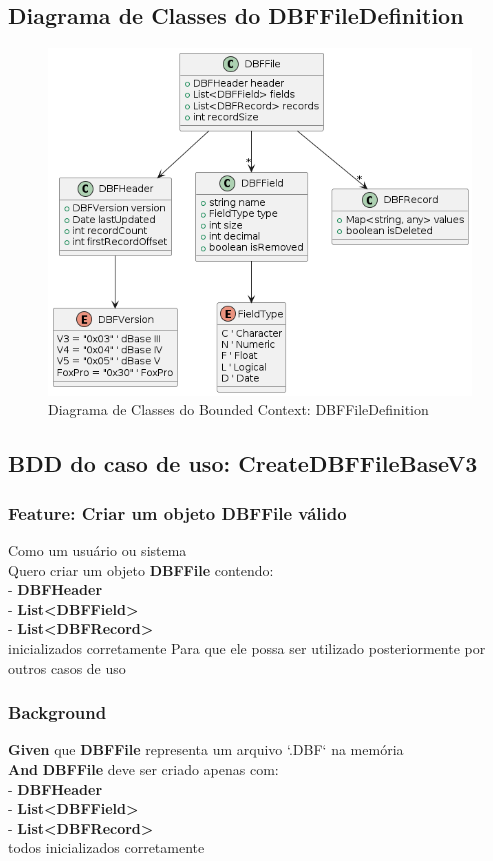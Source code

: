 \subsection{Diagrama de Classes do DBFFileDefinition}
\begin{figure}[H]
    \centering
    \includegraphics[width=1\textwidth]{image/uml_DBFESTRUCTURE.png}
    \caption{Diagrama de Classes do Bounded Context: DBFFileDefinition}
\end{figure}

\subsection{BDD do caso de uso: CreateDBFFileBaseV3}
\subsubsection{Feature: Criar um objeto DBFFile válido}
Como um usuário ou sistema \\
Quero criar um objeto \textbf{DBFFile} contendo: \\
- \textbf{DBFHeader}\\
- \textbf{List<DBFField>} \\
- \textbf{List<DBFRecord>}\\
inicializados corretamente Para que ele possa ser utilizado posteriormente por outros casos de uso \\

\subsubsection{Background}
\textbf{Given} que \textbf{DBFFile} representa um arquivo `.DBF` na memória \\
\textbf{And} \textbf{DBFFile} deve ser criado apenas com: \\
- \textbf{DBFHeader} \\
- \textbf{List<DBFField>}\\
- \textbf{List<DBFRecord>}\\
todos inicializados corretamente

